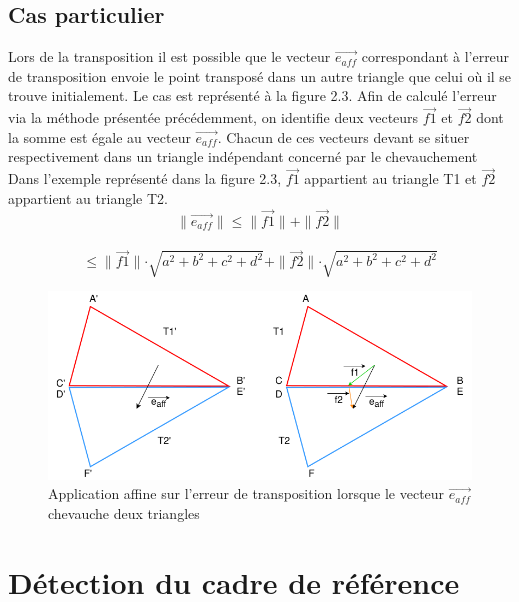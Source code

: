 \documentclass[a4paper, 12pt]{report}
\begin{document}
		\subsection{Cas particulier}
Lors de la transposition il est possible que le vecteur $\overrightarrow{e_{aff}}$ correspondant à l'erreur de transposition envoie le point transposé dans un autre triangle que celui où il se trouve initialement. Le cas est représenté à la figure 2.3. Afin de calculé l'erreur via la méthode présentée précédemment, on identifie deux vecteurs $\overrightarrow{f1}$ et $\overrightarrow{f2}$ dont la somme est égale au vecteur $\overrightarrow{e_{aff}}$. Chacun de ces vecteurs devant se situer respectivement dans un triangle indépendant concerné par le chevauchement\\
Dans l'exemple représenté dans la figure 2.3, $\overrightarrow{f1}$ appartient au triangle T1 et $\overrightarrow{f2}$ appartient au triangle T2.
$$\parallel \overrightarrow{e_{aff}} \parallel \le \parallel \overrightarrow{f1} \parallel + \parallel \overrightarrow{f2} \parallel $$ \\
$$ \le \parallel \overrightarrow{f1} \parallel \cdot \sqrt{a^{2} + b^{2} + c^{2} + d^{2}} + \parallel \overrightarrow{f2} \parallel \cdot \sqrt{a^{2} + b^{2} + c^{2} + d^{2}}$$
\begin{figure}[!h]
	\centering\includegraphics[scale=0.7]{erreur_affine2.png}
	\caption{Application affine sur l'erreur de transposition lorsque le vecteur $ \overrightarrow{e _{aff}}$ chevauche deux triangles }
\end{figure}

\newpage

        \section{Détection du cadre de référence}
\end{document}
